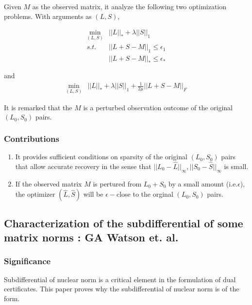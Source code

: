 \documentclass{../common/projectreport}
\begin{document}
Given $M$ as the observed matrix, it analyze the following two optimization problems. With arguments as $(L,S)$,

\begin{eqnarray}
\min_{(L,S)} & ||L||_{*}+\lambda||S||_{1}\nonumber \\
s.t. & ||L+S-M||_{1}\le\epsilon_{1}\\
 & ||L+S-M||_{*}\le\epsilon_{*}\nonumber 
\end{eqnarray}


and 
\begin{eqnarray}
\min_{(L,S)} & ||L||_{*}+\lambda||S||_{1}+\frac{1}{2\mu}||L+S-M||_{F}
\end{eqnarray}


It is remarked that the $M$ is a perturbed observation outcome of the original $(L_{0},S_{0})$ pairs.


\subsubsection{Contributions}
\begin{enumerate}
\item It provides sufficient conditions on sparsity of the original $(L_{0},S_{0})$ pairs that allow accurate recovery in the sense that $||L_{0}-\hat{L}||_{\infty},||S_{0}-\hat{S}||_{\infty}$ is small.
\item If the observed matrix $M$ is pertured from $L_{0}+S_{0}$ by a small amount (i.e.$\epsilon$), the optimizer $(\hat{L}, \hat{S})$ will be $\epsilon-$close to the orginal $(L_{0},S_{0})$ pairs.
\end{enumerate}

\subsection{Characterization of the subdifferential of some matrix norms : GA Watson et. al.}


\subsubsection{Significance}

Subdifferential of nuclear norm is a critical element in the formulation of dual certificates. This paper proves why the subdifferential of nuclear norm is of the form.
\end{document}
